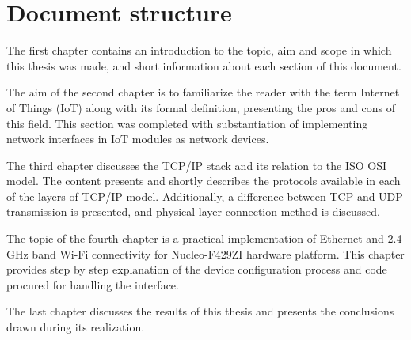 \section{Document structure}

The first chapter contains an introduction to the topic, aim and scope in which this thesis was made, and short information about each section of this document.

The aim of the second chapter is to familiarize the reader with the term Internet of Things (IoT) along with its formal definition, presenting the pros and cons of this field. This section was completed with substantiation of implementing network interfaces in IoT modules as network devices.

The third chapter discusses the TCP/IP stack and its relation to the ISO OSI model. The content presents and shortly describes the protocols available in each of the layers of TCP/IP model. Additionally, a difference between TCP and UDP transmission is presented, and physical layer connection method is discussed.

The topic of the fourth chapter is a practical implementation of Ethernet and 2.4 GHz band Wi-Fi connectivity for Nucleo-F429ZI hardware platform. This chapter provides step by step explanation of the device configuration process and code procured for handling the interface.

The last chapter discusses the results of this thesis and presents the conclusions drawn during its realization.